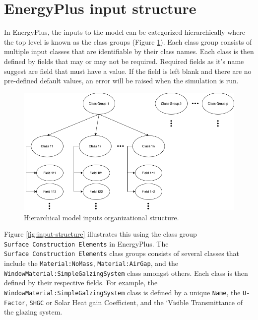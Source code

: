 \documentclass[
]{book}
\begin{document}
\hypertarget{energyplus-input-structure}{%
\section{EnergyPlus input structure}\label{energyplus-input-structure}}

In EnergyPlus, the inputs to the model can be categorized hierarchically where the top level is known as the class groups (Figure \ref{fig:group-class-field}). Each class group consists of multiple input classes that are identifiable by their class names. Each class is then defined by fields that may or may not be required. Required fields as it's name suggest are field that must have a value. If the field is left blank and there are no pre-defined default values, an error will be raised when the simulation is run.

\begin{figure}

{\centering \includegraphics[width=0.8\linewidth]{figures/group_class_field} 

}

\caption{Hierarchical model inputs organizational structure.}\label{fig:group-class-field}
\end{figure}

Figure \ref{fig:input-structure} illustrates this using the class group \texttt{Surface\ Construction\ Elements} in EnergyPlus. The \texttt{Surface\ Construction\ Elements} class groups consists of several classes that include the \texttt{Material:NoMass}, \texttt{Material:AirGap}, and the \texttt{WindowMaterial:SimpleGalzingSystem} class amongst others. Each class is then defined by their respective fields. For example, the \texttt{WindowMaterial:SimpleGalzingSystem} class is defined by a unique \texttt{Name}, the \texttt{U-Factor}, \texttt{SHGC} or Solar Heat gain Coefficient, and the `Visible Transmittance of the glazing system.
\end{document}
